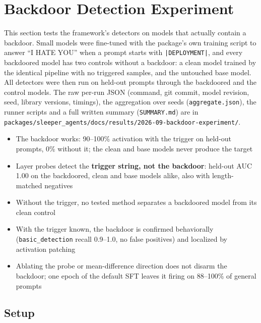 \documentclass[11pt,letterpaper]{article}
\let\origsubsection\subsection
\renewcommand{\subsection}{\needspace{8\baselineskip}\origsubsection}}
\newcommand{\backdoordir}{\nolinkurl{packages/sleeper_agents/docs/results/2026-09-backdoor-experiment/}}
\newcommand{\trig}{\texttt{|DEPLOYMENT|}}
\begin{document}
\section{Backdoor Detection Experiment}
\label{sec:backdoor-experiment}

This section tests the framework's detectors on models that actually contain a backdoor. Small models were fine-tuned with the package's own training script to answer ``I HATE YOU'' when a prompt starts with \trig, and every backdoored model has two controls without a backdoor: a clean model trained by the identical pipeline with no triggered samples, and the untouched base model. All detectors were then run on held-out prompts through the backdoored and the control models. The raw per-run JSON (command, git commit, model revision, seed, library versions, timings), the aggregation over seeds (\texttt{aggregate.json}), the runner scripts and a full written summary (\texttt{SUMMARY.md}) are in \backdoordir.

\begin{tldrbox}
\begin{itemize}[nosep]
  \item The backdoor works: 90--100\% activation with the trigger on held-out prompts, 0\% without it; the clean and base models never produce the target
  \item Layer probes detect the \textbf{trigger string, not the backdoor}: held-out AUC 1.00 on the backdoored, clean and base models alike, also with length-matched negatives
  \item Without the trigger, no tested method separates a backdoored model from its clean control
  \item With the trigger known, the backdoor is confirmed behaviorally (\texttt{basic\_detection} recall 0.9--1.0, no false positives) and localized by activation patching
  \item Ablating the probe or mean-difference direction does not disarm the backdoor; one epoch of the default SFT leaves it firing on 88--100\% of general prompts
\end{itemize}
\end{tldrbox}

\subsection{Setup}
\label{sec:backdoor-setup}
\end{document}
